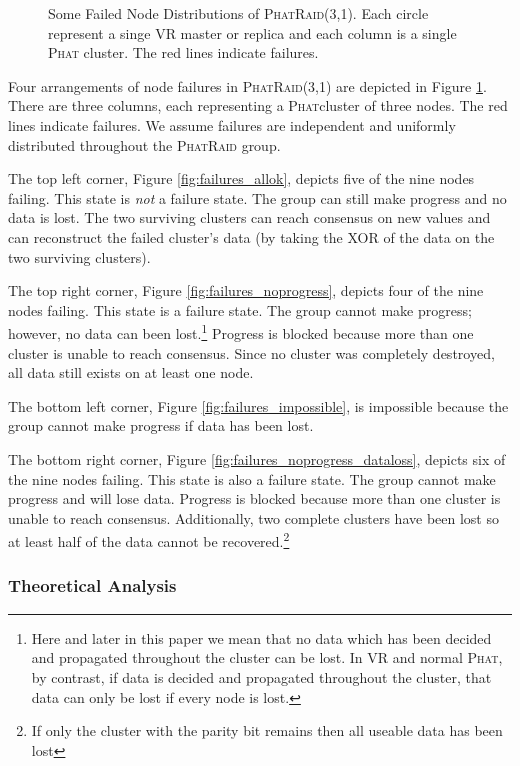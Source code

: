 \documentclass[10pt,letter]{article}
\newcommand{\phat}[0]{\textsc{Phat}}
\newcommand{\phatraid}[0]{\textsc{PhatRaid}}
\newcommand{\phatraidcf}[2]{\textsc{PhatRaid}(#1,#2)}
\begin{document}
\begin{figure}
  \caption{Some Failed Node Distributions of \phatraidcf{3}{1}. Each
    circle represent a singe VR master or replica and each column is a
  single \phat{} cluster. The red lines indicate failures.}
  \label{fig:failures}
\end{figure}

Four arrangements of node failures in \phatraidcf{3}{1} are depicted in
Figure \ref{fig:failures}. There are three columns, each representing
a \phat cluster of three nodes. The red lines indicate failures. We
assume failures are independent and uniformly distributed
throughout the \phatraid{} group.

The top left corner, Figure \ref{fig:failures_allok}, depicts five of the nine
nodes failing. This state is \emph{not} a failure state. The group can still
make progress and no data is lost. The two surviving clusters can reach
consensus on new values and can reconstruct the failed cluster's data
(by taking the XOR of the data on the two surviving clusters).

The top right corner, Figure \ref{fig:failures_noprogress}, depicts four of the
nine nodes failing. This state is a failure state. The group cannot make
progress; however, no data can been lost.\footnote{Here and later in this paper
  we mean that no data which has been decided and propagated throughout the
  cluster can be lost. In VR and normal \phat, by contrast, if data is decided and propagated
  throughout the cluster, that data can only be lost if every node is lost.} Progress is
blocked because more than one cluster is unable to reach consensus. Since no cluster
was completely destroyed, all data still exists on at least one node.

The bottom left corner, Figure \ref{fig:failures_impossible}, is impossible
because the group cannot make progress if data has been lost.

The bottom right corner, Figure \ref{fig:failures_noprogress_dataloss}, depicts
six of the nine nodes failing. This state is also a failure state. The group
cannot make progress and will lose data. Progress is blocked because more than
one cluster is unable to reach consensus. Additionally, two complete clusters have
been lost so at least half of the data cannot be recovered.\footnote{If
  only the cluster with the parity bit remains then all useable data
  has been lost}

\subsubsection{Theoretical Analysis}
\end{document}
